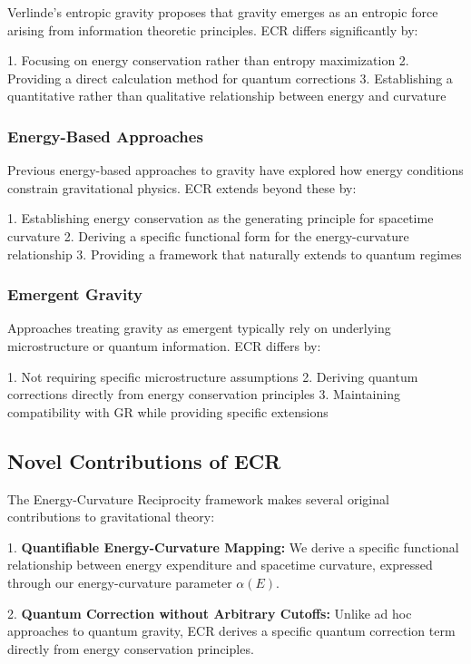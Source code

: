 \documentclass[11pt,a4paper]{article}
\begin{document}
Verlinde's entropic gravity \cite{verlinde2011} proposes that gravity emerges as an entropic force arising from information theoretic principles. ECR differs significantly by:

1. Focusing on energy conservation rather than entropy maximization
2. Providing a direct calculation method for quantum corrections
3. Establishing a quantitative rather than qualitative relationship between energy and curvature

\subsubsection{Energy-Based Approaches}

Previous energy-based approaches to gravity \cite{visser1993, cooperstock1996} have explored how energy conditions constrain gravitational physics. ECR extends beyond these by:

1. Establishing energy conservation as the generating principle for spacetime curvature
2. Deriving a specific functional form for the energy-curvature relationship
3. Providing a framework that naturally extends to quantum regimes

\subsubsection{Emergent Gravity}

Approaches treating gravity as emergent \cite{hu2009, sindoni2012} typically rely on underlying microstructure or quantum information. ECR differs by:

1. Not requiring specific microstructure assumptions
2. Deriving quantum corrections directly from energy conservation principles
3. Maintaining compatibility with GR while providing specific extensions

\subsection{Novel Contributions of ECR}

The Energy-Curvature Reciprocity framework makes several original contributions to gravitational theory:

1. \textbf{Quantifiable Energy-Curvature Mapping:} We derive a specific functional relationship between energy expenditure and spacetime curvature, expressed through our energy-curvature parameter $\alpha(E)$.

2. \textbf{Quantum Correction without Arbitrary Cutoffs:} Unlike ad hoc approaches to quantum gravity, ECR derives a specific quantum correction term directly from energy conservation principles.
\end{document}
